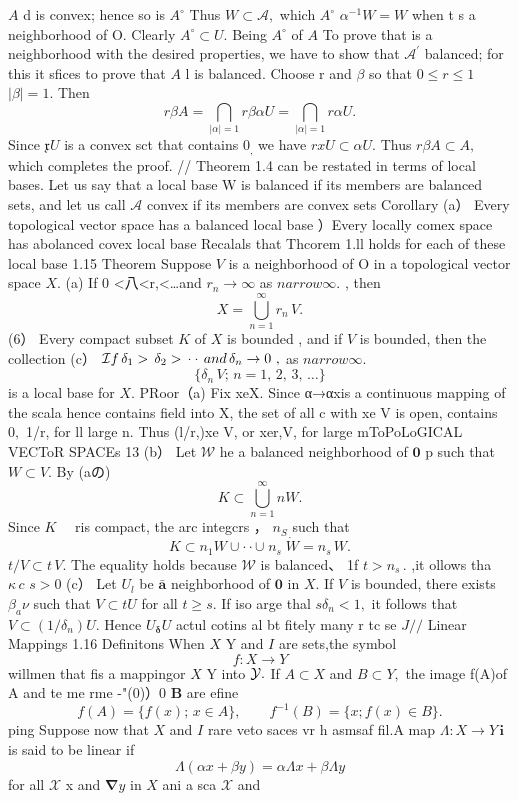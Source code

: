 $\scriptstyle A$ d is convex; hence so is $A^{\circ}$ Thus $W\subset{\mathcal{A}},$ which $A^{\circ}$ $\alpha^{-1}W=W$ when t s a neighborhood of O. Clearly $A^{\circ}\subset U.$ Being $A^{\circ}$ of $\textstyle{A}$ To prove that is a neighborhood with the desired properties, we have to show that ${\mathcal{A}}^{\prime}$ balanced; for this it sfices to prove that $\textstyle A$ l is balanced. Choose r and $\beta$ so that $0\leq r\leq1$ $|\beta|=1.$ Then $$ r\beta A=\bigcap_{|\alpha|=1}r\beta\alpha U=\bigcap_{|\alpha|=1}r\alpha U. $$ Since ${\mathfrak{x}}U$ is a convex sct that contains $0_{\mathrm{,}}$ we have $r x U\subset\alpha U.$ Thus $r\beta A\subset A,$ which completes the proof. // Theorem 1.4 can be restated in terms of local bases. Let us say that a local base W is balanced if its members are balanced sets, and let us call ${\mathcal{A}}$ convex if its members are convex sets Corollary (a） Every topological vector space has a balanced local base ）Every locally comex space has abolanced covex local base Recalals that Thcorem 1.ll holds for each of these local base 1.15 Theorem Suppose ${\mathbf{}}V$ is a neighborhood of O in a topological vector space $X.$ (a) If 0 <八<r,<…and $r_{n}\to\infty$ as $n arrow\infty.$ , then $$ X=\bigcup_{n=1}^{\infty}r_{n}\,V. $$ (6） Every compact subset $\textstyle K$ of $\textstyle X$ is bounded , and if ${\mathbf{}}V$ is bounded, then the collection (c） ${\cal I}f\,\delta_{1}>\,\delta_{2}>\,\cdot\cdot\,a n d\,\delta_{n}\to0\ ,$ as $n arrow\infty.$ $$ \{\delta_{n}\,V;\,n=1,\,2,\,3,\,\ldots\} $$ is a local base for $X.$ PRoor（a) Fix xeX. Since α→αxis a continuous mapping of the scala hence contains field into X, the set of all c with xe V is open, contains $0,$ 1/r, for ll large n. Thus (l/r,)xe V, or xer,V, for large mToPoLoGICAL VECToR SPACEs 13 (b） Let ${\mathcal{W}}$ he a balanced neighborhood of ${\boldsymbol{0}}$ p such that $W\subset V.$ By (aの) $$ K\subset\bigcup_{n=1}^{\infty}n W. $$ Since $K\quad$ ris compact, the arc integcrs ， $\scriptstyle n_{S}$ such that $$ K\subset n_{1}W\cup\cdot\cdot\cup\;n_{s}\;\dot{W}=n_{s}\,W. $$ $t/V\subset t\,V.$ The equality holds because $\mathcal{W}$ is balanced、 1f $t>n_{s}\,.$ ,it ollows tha $\kappa\,c$ $s>0$ (c） Let $U_{\mathit{l}}$ be $\bar{\mathbf{a}}$ neighborhood of $\mathbf{0}$ in $X.$ If ${\mathbf{}}V$ is bounded, there exists $\beta_{a}\nu$ such that $V\subset t U$ for all $t\geqslant s.$ If iso arge thal $s\delta_{n}<1,$ it follows that $V\subset(1/\delta_{n})U.$ Hence $U_{\mathbf{\delta}}U$ actul cotins al bt fitely many r tc se $J/{\big/}$ Linear Mappings 1.16 Definitons When $\textstyle X$ Y and $\boldsymbol{\mathit{I}}$ are sets,the symbol $$ f\colon X\to Y $$ willmen that fis a mappingor $X$ Y into ${\cal{Y}}.$ If $A\subset X$ and $B\subset Y,$ the image f(A)of A and te me rme -"(0)）0 $\boldsymbol{B}$ are efine $$ f(A)=\{f(x);\,x\in A\},\qquad f^{-1}(B)=\{x;f(x)\in B\}. $$ ping Suppose now that $\textstyle X$ and $\boldsymbol{\mathit{I}}$ rare veto saces vr h asmsaf fil.A map $\Lambda\colon X\to Y\,\mathbf{i}$ is said to be linear if $$ \Lambda(\alpha x+\beta y)=\alpha\Lambda x+\beta\Lambda y $$ for all $\textstyle{\mathcal{X}}$ x and $\mathbf{\nabla}y$ in $\textstyle X$ ani a sca $\scriptstyle{\mathcal{X}}$ and 